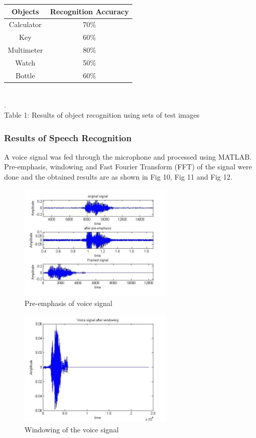 \documentclass[journal,twoside]{IEEEtran}
\begin{document}
\begin{center}
    \begin{tabular}{| c | c |}
        \hline
        \textbf{Objects} & \textbf{Recognition Accuracy}\\ \hline
        Calculator & 70\% \\ \hline
        Key & 60\% \\ \hline
        Multimeter & 80\% \\ \hline
        Watch & 50\%\\ \hline
        Bottle & 60\% \\ \hline
    \end{tabular}\\
    .\\
    Table 1: Results of object recognition using sets of test images
\end{center}

\subsubsection{Results of Speech Recognition}

A voice signal was fed through the microphone and
processed using MATLAB. Pre-emphasis, windowing and
Fast Fourier Transform (FFT) of the signal were done and the
obtained results are as shown in Fig 10, Fig 11 and Fig 12.

\begin{figure}[htbp]
\centering
\includegraphics[width=2.9in]{figure10}
\caption{Pre-emphasis of voice signal}
\label{fig:figure10}
\end{figure}

\begin{figure}[htbp]
\centering
\includegraphics[width=2.9in]{figure11}
\caption{Windowing of the voice signal}
\label{fig:figure11}
\end{figure}
\end{document}
